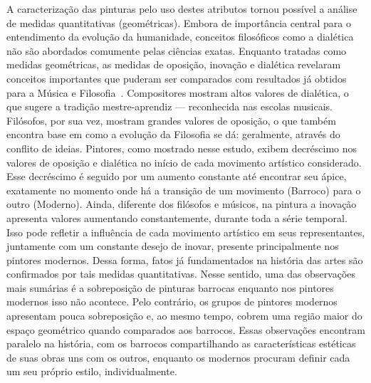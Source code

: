 A caracterização das pinturas pelo uso destes atributos tornou possível a
análise de medidas quantitativas (geométricas). Embora de importância central
para o entendimento da evolução da humanidade, conceitos filosóficos como a
dialética não são abordados comumente pelas ciências exatas. Enquanto tratadas
como medidas geométricas, as medidas de oposição, inovação e dialética revelaram
conceitos importantes que puderam ser comparados com resultados já obtidos para
a Música e Filosofia~\cite{vieira}. Compositores mostram altos valores de
dialética, o que sugere a tradição mestre-aprendiz --- reconhecida nas escolas
musicais. Filósofos, por sua vez, mostram grandes valores de oposição, o que
também encontra base em como a evolução da Filosofia se dá: geralmente, através
do conflito de ideias. Pintores, como mostrado nesse estudo, exibem decréscimo nos
valores de oposição e dialética no início de cada movimento artístico
considerado. Esse decréscimo é seguido por um aumento constante até encontrar seu
ápice, exatamente no momento onde há a transição de um movimento (Barroco) para
o outro (Moderno). Ainda, diferente dos filósofos e músicos, na pintura a
inovação apresenta valores aumentando constantemente, durante toda a série
temporal. Isso pode refletir a influência de cada movimento artístico em seus
representantes, juntamente com um constante desejo de inovar, presente
principalmente nos pintores modernos. Dessa forma, fatos já fundamentados na
história das artes são confirmados por tais medidas quantitativas. Nesse
sentido, uma das observações mais sumárias é a sobreposição de pinturas barrocas
enquanto nos pintores modernos isso não acontece. Pelo contrário, os grupos de
pintores modernos apresentam pouca sobreposição e, ao mesmo tempo, cobrem uma
região maior do espaço geométrico quando comparados aos barrocos. Essas
observações encontram paralelo na história, com os barrocos compartilhando as
características estéticas de suas obras uns com os outros, enquanto os modernos
procuram definir cada um seu próprio estilo, individualmente.


